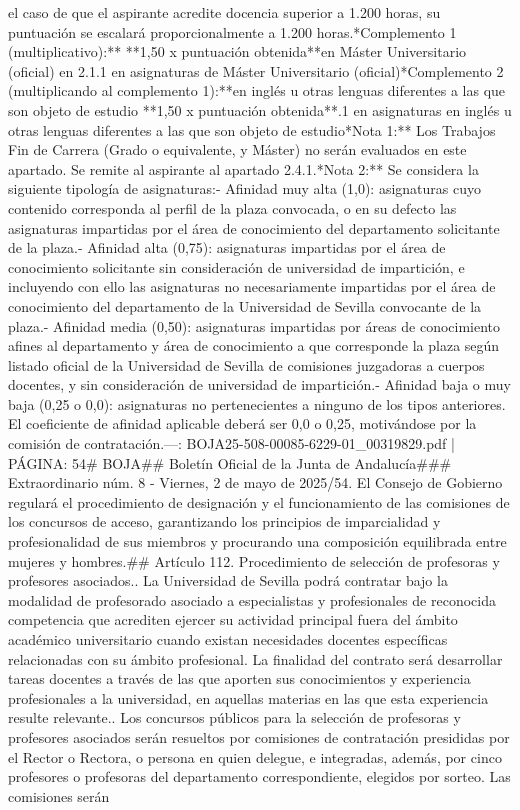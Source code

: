 \documentclass{article}
\begin{document}
\begin{itemize}
{{el caso de que el aspirante acredite docencia superior a 1.200 horas, su puntuación se escalará proporcionalmente a 1.200 horas.\n\n**Complemento 1 (multiplicativo):**                             **1,50 x puntuación obtenida**\nDocencia en Máster Universitario (oficial)                  en 2.1.1 en asignaturas de Máster Universitario (oficial)\n\n**Complemento 2 (multiplicando al complemento 1):**\nDocencia en inglés u otras lenguas diferentes a las que son objeto de estudio                                      **1,50 x puntuación obtenida**.1 en asignaturas en inglés u otras lenguas diferentes a las que son objeto de estudio\n\n**Nota 1:** Los Trabajos Fin de Carrera (Grado o equivalente, y Máster) no serán evaluados en este apartado. Se remite al aspirante al apartado 2.4.1.\n**Nota 2:** Se considera la siguiente tipología de asignaturas:\n- Afinidad muy alta (1,0): asignaturas cuyo contenido corresponda al perfil de la plaza convocada, o en su defecto las asignaturas impartidas por el área de conocimiento del departamento solicitante de la plaza.\n- Afinidad alta  (0,75): asignaturas impartidas por el área de conocimiento solicitante sin consideración de universidad de impartición, e incluyendo con ello las asignaturas no necesariamente impartidas por el área de conocimiento del departamento de la Universidad de Sevilla convocante de la plaza.\n- Afinidad media  (0,50): asignaturas impartidas por áreas de conocimiento afines al departamento y área de conocimiento a que corresponde la plaza según listado oficial de la Universidad de Sevilla de comisiones juzgadoras a cuerpos docentes, y sin consideración de universidad de impartición.\n- Afinidad baja o muy baja      (0,25 o 0,0): asignaturas no pertenecientes a ninguno de los tipos anteriores. El coeficiente de afinidad aplicable deberá ser 0,0 o 0,25, motivándose por la comisión de contratación.\n\n---\n\nFUENTE: BOJA25-508-00085-6229-01_00319829.pdf | PÁGINA: 54\n# BOJA\n## Boletín Oficial de la Junta de Andalucía\n### Extraordinario núm. 8 - Viernes, 2 de mayo de 2025/54\n{}. El Consejo de Gobierno regulará el procedimiento de designación y el funcionamiento de las comisiones de los concursos de acceso, garantizando los principios de imparcialidad y profesionalidad de sus miembros y procurando una composición equilibrada entre mujeres y hombres.\n\n## Artículo 112. Procedimiento de selección de profesoras y profesores asociados.. La Universidad de Sevilla podrá contratar bajo la modalidad de profesorado asociado a especialistas y profesionales de reconocida competencia que acrediten ejercer su actividad principal fuera del ámbito académico universitario cuando existan necesidades docentes específicas relacionadas con su ámbito profesional. La finalidad del contrato será desarrollar tareas docentes a través de las que aporten sus conocimientos y experiencia profesionales a la universidad, en aquellas materias en las que esta experiencia resulte relevante.. Los concursos públicos para la selección de profesoras y profesores asociados serán resueltos por comisiones de contratación presididas por el Rector o Rectora, o persona en quien delegue, e integradas, además, por cinco profesores o profesoras del departamento correspondiente, elegidos por sorteo. Las comisiones serán }}
\end{itemize}
\end{document}
